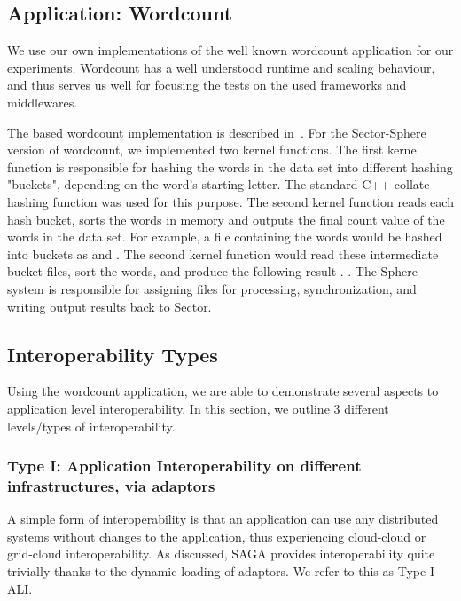 \documentclass[3p,twocolumn]{elsarticle}
\begin{document}
\subsection{Application: Wordcount}
\label{ssec:app}

We use our own implementations of the well known wordcount application
for our experiments.  Wordcount has a well understood runtime and
scaling behaviour, and thus serves us well for focusing the tests on
the used frameworks and middlewares.

The \MR based wordcount implementation is described
in~\cite{saga_ccgrid09}.  For the Sector-Sphere version of wordcount,
we implemented two kernel functions. The first kernel function is
responsible for hashing the words in the data set into different
hashing "buckets", depending on the word's starting letter.  The
standard C++ collate hashing function was used for this purpose.  The
second kernel function reads each hash bucket, sorts the words in
memory and outputs the final count value of the words in the data set.
For example, a file containing the words  would be hashed into buckets as  and
.  The second kernel function would read these
intermediate bucket files, sort the words, and produce the following
result .  .  The Sphere system is
responsible for assigning files for processing, synchronization, and
writing output results back to Sector.


\subsection{Interoperability Types}

Using the wordcount application, we are able to demonstrate several
aspects to application level interoperability. In this section, we
outline 3 different levels/types of interoperability.


\subsubsection{Type I: Application Interoperability on different
  infrastructures, via adaptors}
%
%
A simple form of interoperability is that an application can use any
distributed systems without changes to the application, thus
experiencing cloud-cloud or grid-cloud interoperability.  As
discussed, SAGA provides interoperability quite trivially thanks to
the dynamic loading of adaptors.  We refer to this as Type I ALI.
\end{document}
